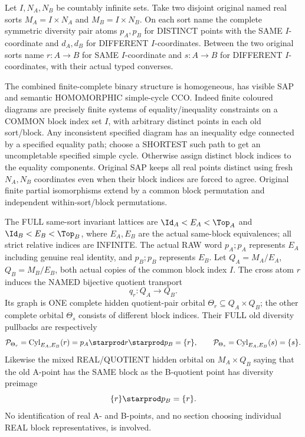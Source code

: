 \begin{example}
\label{ex:typed-mixed-block-orbital-diagonal}
Let $I,N_A,N_B$ be countably
infinite sets. Take two disjoint
original named real sorts
$M_A=I\times N_A$ and
$M_B=I\times N_B$.
On each sort name the complete
symmetric diversity pair atoms
$p_A,p_B$ for DISTINCT points
with the SAME $I$-coordinate
and $d_A,d_B$ for DIFFERENT
$I$-coordinates. Between
the two original sorts
name $r:A\to B$ for
SAME $I$-coordinate and
$s:A\to B$ for DIFFERENT
$I$-coordinates, with their
actual typed converses.

The combined finite-complete
binary structure is homogeneous,
has visible SAP and semantic
HOMOMORPHIC simple-cycle CCO.
Indeed finite coloured diagrams
are precisely finite systems
of equality/inequality
constraints on a COMMON block
index set $I$, with arbitrary
distinct points in each old
sort/block. Any inconsistent
specified diagram has an
inequality edge connected by
a specified equality path;
choose a SHORTEST such path
to get an uncompletable
specified simple cycle.
Otherwise assign distinct
block indices to the equality
components. Original SAP
keeps all real points distinct
using fresh $N_A,N_B$
coordinates even when
their block indices are forced
to agree. Original finite
partial isomorphisms extend
by a common block permutation
and independent
within-sort/block permutations.

The FULL same-sort invariant
lattices are
$\Id_A<E_A<\Top_A$ and
$\Id_B<E_B<\Top_B$, where
$E_A,E_B$ are the actual
same-block equivalences;
all strict relative indices
are INFINITE. The actual
RAW word $p_A;p_A$ represents
$E_A$ including genuine
real identity, and
$p_B;p_B$ represents $E_B$.
Let $Q_A=M_A/E_A$,
$Q_B=M_B/E_B$, both actual
copies of the common block
index $I$.
The cross atom $r$
induces the NAMED
bijective quotient
transport
\[
                   q_r:Q_A\longrightarrow Q_B.
\]
Its graph is ONE complete
hidden quotient-pair orbital
$\Theta_r\subseteq Q_A\times Q_B$;
the other complete orbital
$\Theta_s$ consists of
different block indices.
Their FULL old diversity
pullbacks are respectively
\[
 \mathcal P_{\Theta_r}
   =\operatorname{Cyl}_{E_A,E_B}(r)
   =p_A\starprod r\starprod p_B
   =\{r\},
\qquad
 \mathcal P_{\Theta_s}
   =\operatorname{Cyl}_{E_A,E_B}(s)
   =\{s\}.
\]
Likewise the mixed REAL/QUOTIENT
hidden orbital on
$M_A\times Q_B$
saying that the old A-point
has the SAME block as the
B-quotient point has
diversity preimage
\[
                   \{r\}\starprod p_B=\{r\}.
\]
No identification of real
A- and B-points, and no
section choosing individual
REAL block representatives,
is involved.


\end{example}
